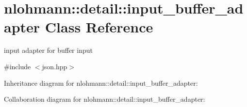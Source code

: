 \hypertarget{classnlohmann_1_1detail_1_1input__buffer__adapter}{}\section{nlohmann\+:\+:detail\+:\+:input\+\_\+buffer\+\_\+adapter Class Reference}
\label{classnlohmann_1_1detail_1_1input__buffer__adapter}


input adapter for buffer input  




{\ttfamily \#include $<$json.\+hpp$>$}



Inheritance diagram for nlohmann\+:\+:detail\+:\+:input\+\_\+buffer\+\_\+adapter\+:


Collaboration diagram for nlohmann\+:\+:detail\+:\+:input\+\_\+buffer\+\_\+adapter\+:
